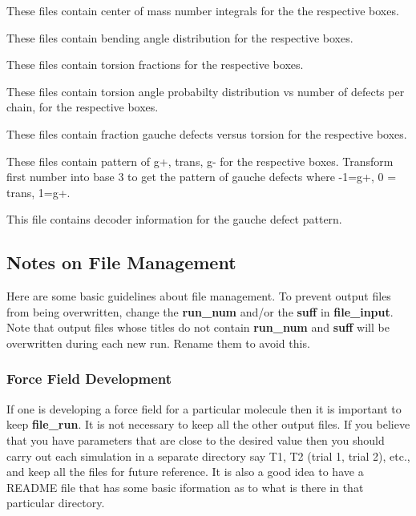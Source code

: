 \documentclass[12pt,letterpaper]{article}
\begin{document}
These files contain center of mass number integrals for the
the respective boxes.

 These files contain bending angle
distribution for the respective boxes.

 These files contain torsion fractions
for the respective boxes.

 These files contain torsion angle
probabilty distribution vs number of defects per chain, for
the respective boxes.

 These files contain fraction gauche
defects versus torsion for the respective boxes.

These files contain pattern of g+, trans, g- for the
respective boxes. Transform first number into base 3 to get
the pattern of gauche defects where -1=g+, 0 = trans, 1=g+.

 This file contains decoder
information for the gauche defect pattern.

\subsection{Notes on File Management}
\noindent Here are some basic guidelines about file
management. To prevent output files from being overwritten,
change the {\bf run\_num} and/or the {\bf suff} in {\bf
  file\_input}. Note that output files whose titles do not
contain {\bf run\_num} and {\bf suff} will be overwritten
during each new run. Rename them to avoid this.

\subsubsection{Force Field Development} If one is developing a force
field for a particular molecule then it is important to keep
{\bf file\_run}. It is not necessary to keep all the other
output files. If you believe that you have parameters that
are close to the desired value then you should carry out
each simulation in a separate directory say T1, T2 (trial 1,
trial 2), etc., and keep all the files for future reference.
It is also a good idea to have a README file that has some
basic iformation as to what is there in that particular
directory.
\end{document}
